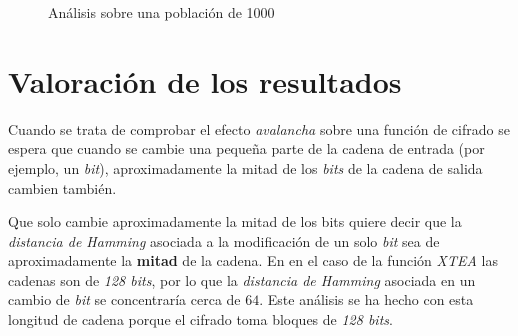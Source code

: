 \documentclass[11pt,a4paper]{article}
\begin{document}
\begin{figure}[h]
  \centering
  
  \caption{Análisis sobre una población de 1000}
\end{figure}


\section{Valoración de los resultados}

Cuando se trata de comprobar el efecto \emph{avalancha} sobre una
función de cifrado se espera que cuando se cambie una pequeña parte
de la cadena de entrada (por ejemplo, un \emph{bit}), aproximadamente
la mitad de los \emph{bits} de la cadena de salida cambien también.

Que solo cambie aproximadamente la mitad de los bits quiere decir que
la \emph{distancia de Hamming} asociada a la modificación de un solo
\emph{bit} sea de aproximadamente la \textbf{mitad} de la cadena. En
en el caso de la función \emph{XTEA} las cadenas son de \emph{128
  bits}, por lo que la \emph{distancia de Hamming} asociada en un
cambio de \emph{bit} se concentraría cerca de $64$. Este análisis se
ha hecho con esta longitud de cadena porque el cifrado toma bloques de
\emph{128 bits}.
\end{document}

